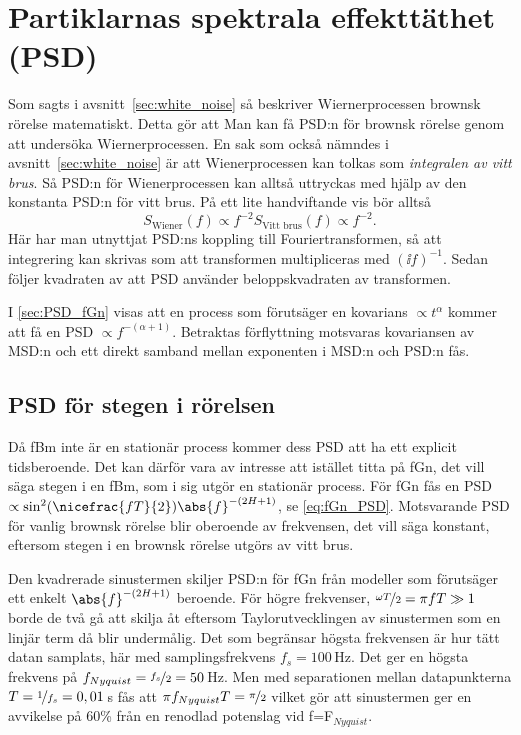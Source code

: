 \section{Partiklarnas spektrala effekttäthet (PSD)}

Som sagts i avsnitt~\ref{sec:white_noise} så beskriver Wiernerprocessen brownsk rörelse matematiskt. Detta gör att Man kan få PSD:n för brownsk rörelse genom att undersöka Wiernerprocessen. En sak som också nämndes i avsnitt~\ref{sec:white_noise} är att Wienerprocessen kan tolkas som \emph{integralen av vitt brus}. Så PSD:n för Wienerprocessen kan alltså uttryckas med hjälp av den konstanta PSD:n för vitt brus.
På ett lite handviftande vis bör alltså 
\begin{equation}
S_\text{Wiener} (f) \propto f^{-2} S_\text{Vitt brus}(f) \propto f^{-2}.
\end{equation}
Här har man utnyttjat PSD:ns koppling till Fouriertransformen, så att integrering kan skrivas som att transformen multipliceras med $(\ii f)^{-1}$. Sedan följer kvadraten av att PSD använder beloppskvadraten av transformen. 

I \ref{sec:PSD_fGn} visas att en process som förutsäger en kovarians $\propto t^{\alpha}$ kommer att få en PSD $\propto f^{-(\alpha+1)}$. Betraktas förflyttning motsvaras kovariansen av MSD:n och ett direkt samband mellan exponenten i MSD:n och PSD:n fås.


\subsection{PSD för stegen i rörelsen}
Då fBm inte är en stationär process kommer dess PSD att ha ett explicit tidsberoende. Det kan därför vara av intresse att istället titta på fGn, det vill säga stegen i en fBm, som i sig utgör en stationär process. För fGn fås en PSD $\propto \sin^2(\nicefrac{f T}{2}) \abs{f}^{-(2H+1)}$, se \eqref{eq:fGn_PSD}. Motsvarande PSD för vanlig brownsk rörelse blir oberoende av frekvensen, det vill säga konstant, eftersom stegen i en brownsk rörelse utgörs av vitt brus.

Den kvadrerade sinustermen skiljer PSD:n för fGn från modeller som förutsäger ett enkelt $\abs{f}^{-(2H+1)}$ beroende. För högre frekvenser, $\nicefrac{\omega T}{2}=\pi f T \gg 1$ borde de två gå att skilja åt eftersom Taylorutvecklingen av sinustermen som en linjär term då blir undermålig. Det som begränsar högsta frekvensen är hur tätt datan samplats, här med samplingsfrekvens $f_s=100$\,Hz. Det ger en högsta frekvens på $f_{Nyquist}=\nicefrac{f_s}{2}=50$\,Hz. Men med separationen mellan datapunkterna $T=\nicefrac{1}{f_s}=0,01$\,s fås att $\pi f_{Nyquist}T =\nicefrac{\pi}{2}$
vilket gör att sinustermen ger en avvikelse på 60\% från en renodlad potenslag vid f=F$_{Nyquist}$.

